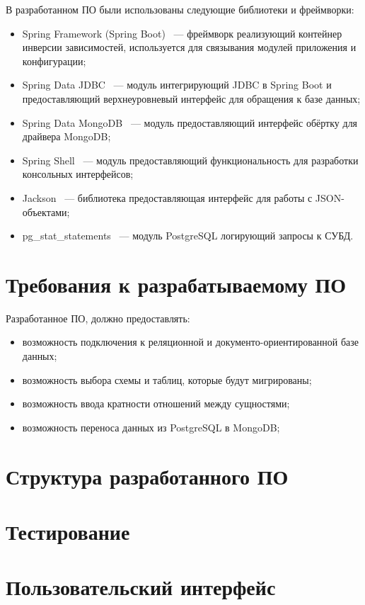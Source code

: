 В разработанном ПО были использованы следующие библиотеки и фреймворки:
\begin{itemize}[label=---]
    \item Spring Framework (Spring Boot)~\cite{spring-boot} --- фреймворк реализующий контейнер инверсии зависимостей, 
    используется для связывания модулей приложения и конфигурации;
    \item Spring Data JDBC~\cite{spring-data-jdbc} --- модуль интегрирующий JDBC в Spring Boot и
    предоставляющий верхнеуровневый интерфейс для обращения к базе данных;
    \item Spring Data MongoDB~\cite{spring-data-mongodb} --- модуль предоставляющий интерфейс обёртку для драйвера MongoDB;
    \item Spring Shell~\cite{spring-shell} --- модуль предоставляющий функциональность для разработки консольных интерфейсов;
    \item Jackson~\cite{jackson-databind} --- библиотека предоставляющая интерфейс для работы с JSON-объектами;
    \item pg\_stat\_statements~\cite{pg-stat-statements} --- модуль PostgreSQL логирующий запросы к СУБД.
\end{itemize}


\section{Требования к разрабатываемому ПО}
Разработанное ПО, должно предоставлять:
\begin{itemize}[label=---]
    \item возможность подключения к реляционной и документо-ориентированной базе данных;
    \item возможность выбора схемы и таблиц, которые будут мигрированы;
    \item возможность ввода кратности отношений между сущностями;
    \item возможность переноса данных из PostgreSQL в MongoDB;
\end{itemize}


\section{Структура разработанного ПО}

\section{Тестирование}

\section{Пользовательский интерфейс}